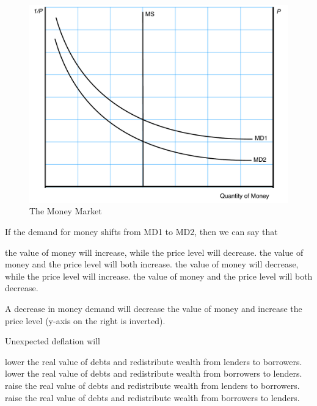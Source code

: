 \documentclass[addpoints,11pt]{exam}
\theoremstyle{definition}
\begin{document}
\begin{questions}
	\begin{figure}[H]
		\centering
		\includegraphics[scale=.40]{Final_MC8.pdf}
		\caption{The Money Market}
		\label{MC8}
	\end{figure}
	

	
	If the demand for money shifts from MD1 to MD2, then we can say that 
	
	\begin{choices}
		\choice the value of money will increase, while the price level will decrease.
		\choice the value of money and the price level will both increase.
		\CorrectChoice the value of money will decrease, while the price level will increase.
		\choice the value of money and the price level will both decrease.
	\end{choices}
	
	\begin{solution}
		A decrease in money demand will decrease the value of money and increase the price level (y-axis on the right is inverted).
	\end{solution}
	

	\question Unexpected deflation will
	
	\begin{choices}
		\choice lower the real value of debts and redistribute wealth from lenders to borrowers.
		\choice lower the real value of debts and redistribute wealth from borrowers to lenders.
		\choice raise the real value of debts and redistribute wealth from lenders to borrowers.
		\CorrectChoice raise the real value of debts and redistribute wealth from borrowers to lenders.
	\end{choices}
	

\end{questions}
\end{document}
